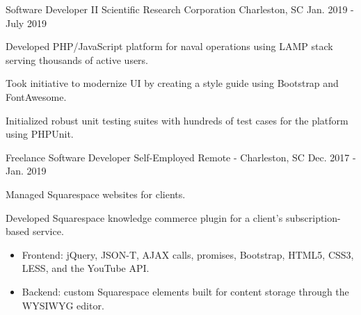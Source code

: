 \begin{cventries}
  \cventry
    {Software Developer II} %
    {Scientific Research Corporation} %
    {Charleston, SC} %
    {Jan. 2019 - July 2019} %
    {
      \begin{cvitems} %
        \item {Developed PHP/JavaScript platform for naval operations using LAMP stack serving thousands of active users.}
        \item {Took initiative to modernize UI by creating a style guide using Bootstrap and FontAwesome.}
        \item {Initialized robust unit testing suites with hundreds of test cases for the platform using PHPUnit.}
      \end{cvitems}
    }

  \cventry
    {Freelance Software Developer} %
    {Self-Employed} %
    {Remote - Charleston, SC} %
    {Dec. 2017 - Jan. 2019} %
    {
      \begin{cvitems} %
        \item {Managed Squarespace websites for clients.}
        \item {Developed Squarespace knowledge commerce plugin for a client's subscription-based service.}
        \begin{itemize}
          \vspace{.5mm}
          \item {Frontend: jQuery, JSON-T, AJAX calls, promises, Bootstrap, HTML5, CSS3, LESS, and the YouTube API.}
          \vspace{1.0mm}
          \item {Backend: custom Squarespace elements built for content storage through the WYSIWYG editor.}
        \end{itemize}
      \end{cvitems}
    }


\end{cventries}
